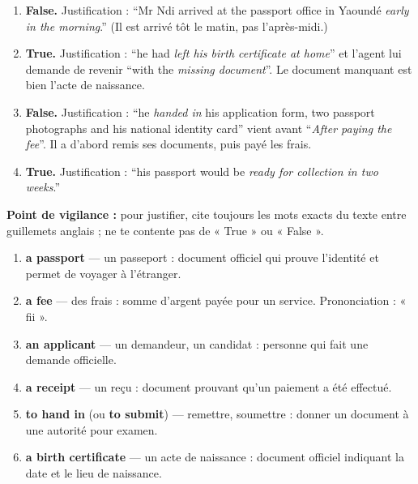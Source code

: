 \documentclass[11pt]{article}
\begin{document}
\begin{corrige}
\begin{enumerate}
\item \textbf{False.} Justification : “Mr Ndi arrived at the passport office in Yaoundé \emph{early in the morning}.” (Il est arrivé tôt le matin, pas l'après-midi.)
\item \textbf{True.} Justification : “he had \emph{left his birth certificate at home}” et l'agent lui demande de revenir “with the \emph{missing document}”. Le document manquant est bien l'acte de naissance.
\item \textbf{False.} Justification : “he \emph{handed in} his application form, two passport photographs and his national identity card” vient avant “\emph{After paying the fee}”. Il a d'abord remis ses documents, puis payé les frais.
\item \textbf{True.} Justification : “his passport would be \emph{ready for collection in two weeks}.”
\end{enumerate}
\textbf{Point de vigilance :} pour justifier, cite toujours les mots exacts du texte entre guillemets anglais ; ne te contente pas de « True » ou « False ».
\end{corrige}

\begin{corrige}
\begin{enumerate}
\item \textbf{a passport} — un passeport : document officiel qui prouve l'identité et permet de voyager à l'étranger.
\item \textbf{a fee} — des frais : somme d'argent payée pour un service. Prononciation : « fii ».
\item \textbf{an applicant} — un demandeur, un candidat : personne qui fait une demande officielle.
\item \textbf{a receipt} — un reçu : document prouvant qu'un paiement a été effectué.
\item \textbf{to hand in} (ou \textbf{to submit}) — remettre, soumettre : donner un document à une autorité pour examen.
\item \textbf{a birth certificate} — un acte de naissance : document officiel indiquant la date et le lieu de naissance.
\end{enumerate}
\end{corrige}
\end{document}

